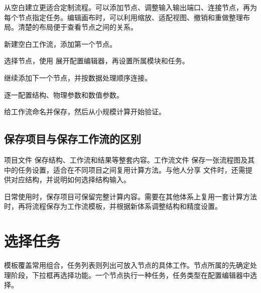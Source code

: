 从空白建立更适合定制流程。可以添加节点、调整输入输出端口、连接节点，再为每个节点指定任务。编辑画布时，可以利用缩放、适配视图、撤销和重做整理布局。清楚的布局便于查看节点之间的关系。

\begin{steps}
\item 新建空白工作流，添加第一个节点。
\item 选择节点，使用  展开配置编辑器，再设置所属模块和任务。
\item 继续添加下一个节点，并按数据处理顺序连接。
\item 逐一配置结构、物理参数和数值参数。
\item 给工作流命名并保存，然后从小规模计算开始验证。
\end{steps}

\subsection{保存项目与保存工作流的区别}

项目文件  保存结构、工作流和结果等整套内容。工作流文件  保存一张流程图及其中的任务设置，适合在不同项目之间复用计算方法。与他人分享  文件时，还需提供对应结构，并说明如何选择结构输入。

日常使用时，保存项目可保留完整计算内容。需要在其他体系上复用一套计算方法时，再将流程保存为工作流模板，并根据新体系调整结构和精度设置。


\section{选择任务}\label{sec:task-catalog}

模板覆盖常用组合，任务列表则列出可放入节点的具体工作。节点所属的先确定处理阶段，下拉框再选择功能。一个节点执行一种任务，任务类型在配置编辑器中选择。

